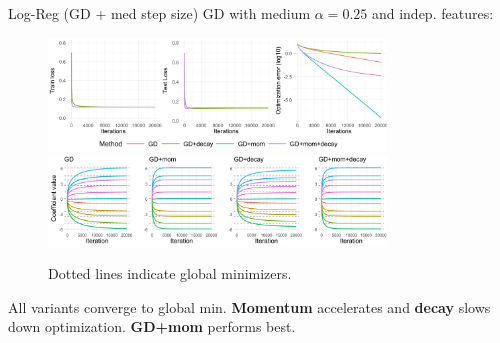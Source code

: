 \documentclass[11pt,compress,t,notes=noshow, xcolor=table]{beamer}
\begin{document}
\begin{vbframe}{Log-Reg (GD + med step size)}
\vspace{-0.4cm}
GD with medium $\alpha=0.25$ and indep. features:
\begin{figure}
            \includegraphics[width=0.8\textwidth]{figure_man/simu_linmod/GD_log_med_lr_iters.pdf} \\
             \includegraphics[width=0.8\textwidth]{figure_man/simu_linmod/GD_log_coef_med.pdf}\\
            \begin{footnotesize}
            Dotted lines indicate global minimizers.
            \end{footnotesize}
\end{figure}
All variants converge to global min. \textbf{Momentum} accelerates
and \textbf{decay} slows down optimization. \textbf{GD+mom} performs best.
\end{vbframe}
\end{document}

